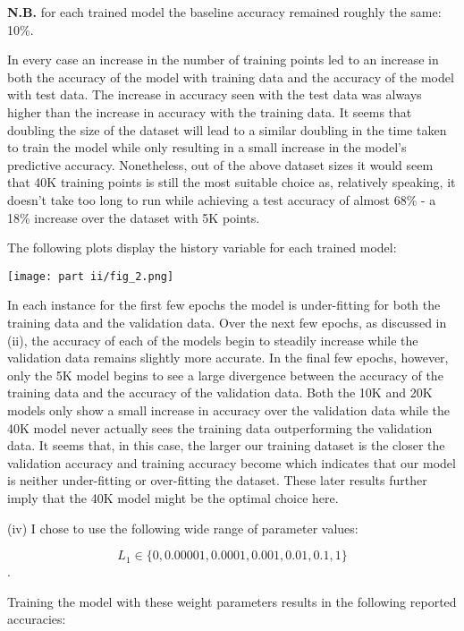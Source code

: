 \documentclass[12pt]{article}
\begin{document}
\textbf{N.B.} for each trained model the baseline accuracy remained roughly the same: 10\%.

In every case an increase in the number of training points led to an increase in both the accuracy of the model with training data and the accuracy of the model with test data. The increase in accuracy seen with the test data was always higher than the increase in accuracy with the training data. It seems that doubling the size of the dataset will lead to a similar doubling in the time taken to train the model while only resulting in a small increase in the model's predictive accuracy. Nonetheless, out of the above dataset sizes it would seem that 40K training points is still the most suitable choice as, relatively speaking, it doesn't take too long to run while achieving a test accuracy of almost 68\% - a 18\% increase over the dataset with 5K points.

The following plots display the history variable for each trained model:

\begin{center}
    \texttt{[image: part ii/fig\_2.png]}
\end{center}

In each instance for the first few epochs the model is under-fitting for both the training data and the validation data. Over the next few epochs, as discussed in (ii), the accuracy of each of the models begin to steadily increase while the validation data remains slightly more accurate. In the final few epochs, however, only the 5K model begins to see a large divergence between the accuracy of the training data and the accuracy of the validation data. Both the 10K and 20K models only show a small increase in accuracy over the validation data while the 40K model never actually sees the training data outperforming the validation data. It seems that, in this case, the larger our training dataset is the closer the validation accuracy and training accuracy become which indicates that our model is neither under-fitting or over-fitting the dataset. These later results further imply that the 40K model might be the optimal choice here.

\indent (iv) I chose to use the following wide range of parameter values:

$$L_1 \in \{ 0, 0.00001, 0.0001, 0.001, 0.01, 0.1, 1 \}$$.

Training the model with these weight parameters results in the following reported accuracies:
\end{document}

